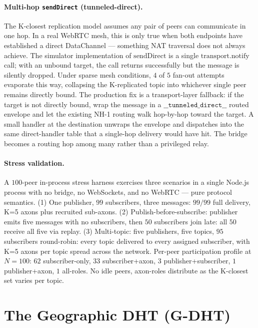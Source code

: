 \documentclass[conference]{IEEEtran}
\newcommand{\GDHT}{G-DHT\xspace}
\begin{document}
\paragraph{Multi-hop \texttt{sendDirect} (tunneled-direct).}
The K-closest replication model assumes any pair of peers can
communicate in one hop. In a real WebRTC mesh, this is only true
when both endpoints have established a direct DataChannel ---
something NAT traversal does not always achieve. The simulator
implementation of $\mathrm{sendDirect}$ is a single
$\mathrm{transport.notify}$ call; with an unbound target, the call
returns successfully but the message is silently dropped. Under
sparse mesh conditions, $4$ of $5$ fan-out attempts evaporate this
way, collapsing the K-replicated topic into whichever single peer
remains directly bound. The production fix is a transport-layer
fallback: if the target is not directly bound, wrap the message in
a $\texttt{\_\_tunneled\_direct\_\_}$ routed envelope and let the
existing NH-1 routing walk hop-by-hop toward the target. A small
handler at the destination unwraps the envelope and dispatches into
the same direct-handler table that a single-hop delivery would
have hit. The bridge becomes a routing hop among many rather than
a privileged relay.

\paragraph{Stress validation.}
A $100$-peer in-process stress harness exercises three scenarios in
a single Node.js process with no bridge, no WebSockets, and no
WebRTC --- pure protocol semantics. (1) One publisher, $99$
subscribers, three messages: $99/99$ full delivery, K=5 axons
plus recruited sub-axons. (2) Publish-before-subscribe: publisher
emits five messages with no subscribers, then $50$ subscribers
join late: all $50$ receive all five via replay. (3) Multi-topic:
five publishers, five topics, $95$ subscribers round-robin: every
topic delivered to every assigned subscriber, with K=5 axons per
topic spread across the network. Per-peer participation profile at
$N=100$: $62$ subscriber-only, $33$ subscriber+axon, $3$
publisher+subscriber, $1$ publisher+axon, $1$ all-roles. No idle
peers, axon-roles distribute as the K-closest set varies per
topic.

\section{The Geographic DHT (\GDHT)}
\label{sec:gdht}
\end{document}
